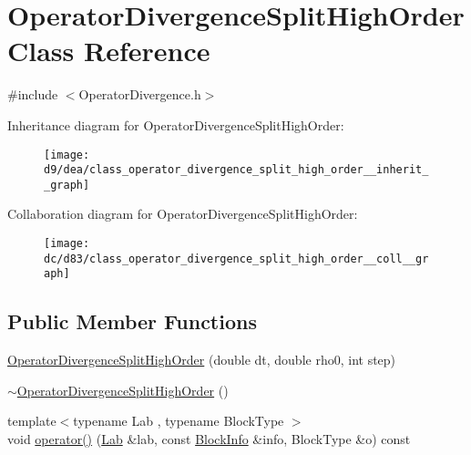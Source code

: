 \hypertarget{class_operator_divergence_split_high_order}{}\section{Operator\+Divergence\+Split\+High\+Order Class Reference}
\label{class_operator_divergence_split_high_order}


{\ttfamily \#include $<$Operator\+Divergence.\+h$>$}



Inheritance diagram for Operator\+Divergence\+Split\+High\+Order\+:\nopagebreak
\begin{figure}[H]
\begin{center}
\leavevmode
\texttt{[image: d9/dea/class\_operator\_divergence\_split\_high\_order\_\_inherit\_\_graph]}
\end{center}
\end{figure}


Collaboration diagram for Operator\+Divergence\+Split\+High\+Order\+:\nopagebreak
\begin{figure}[H]
\begin{center}
\leavevmode
\texttt{[image: dc/d83/class\_operator\_divergence\_split\_high\_order\_\_coll\_\_graph]}
\end{center}
\end{figure}
\subsection*{Public Member Functions}
\begin{DoxyCompactItemize}
\item 
\hyperlink{class_operator_divergence_split_high_order_a707ec7a6c74a6d965fdbd026e5a3c7c9}{Operator\+Divergence\+Split\+High\+Order} (double dt, double rho0, int step)
\item 
\hyperlink{class_operator_divergence_split_high_order_a7eaeb8f57838ea962dcf91b60094e5ae}{$\sim$\+Operator\+Divergence\+Split\+High\+Order} ()
\item 
{\footnotesize template$<$typename Lab , typename Block\+Type $>$ }\\void \hyperlink{class_operator_divergence_split_high_order_ac60d292305a45684efcf88b0e9fc1618}{operator()} (\hyperlink{_definitions_8h_ad6f951af9a2a6ebc1975404882b34314}{Lab} \&lab, const \hyperlink{struct_block_info}{Block\+Info} \&info, Block\+Type \&o) const 
\end{DoxyCompactItemize}
